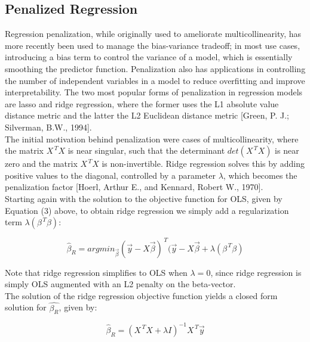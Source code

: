 \documentclass[12pt]{article}
\begin{document}
\subsection{Penalized Regression}\label{subsec3}

Regression penalization, while originally used to ameliorate multicollinearity, has more recently been used to manage the bias-variance tradeoff; in most use cases, introducing a bias term to control the variance of a model, which is essentially smoothing the predictor function. Penalization also has applications in controlling the number of independent variables in a model to reduce overfitting and improve interpretability. The two most popular forms of penalization in regression models are lasso and ridge regression, where the former uses the L1 absolute value distance metric and the latter the L2 Euclidean distance metric [Green, P. J.; Silverman, B.W., 1994]. \\

The initial motivation behind penalization were cases of multicollinearity, where the matrix $X^{\, T}X$ is near singular, such that the determinant $det(X^{\, T}X)$ is near zero and the matrix $X^{\, T}X$ is non-invertible. Ridge regression solves this by adding positive values to the diagonal, controlled by a parameter $\lambda$, which becomes the penalization factor [Hoerl, Arthur E., and Kennard, Robert W., 1970]. \\

Starting again with the solution to the objective function for OLS, given by Equation (3) above, to obtain ridge regression we simply add a regularization term $\lambda(\beta^{\, T}\beta)$:

\begin{equation}
\hat{\beta}_{R}=argmin_{\vec{\beta}}(\vec{y}-X\vec{\beta})^{\, T}(\vec{y}-X\vec{\beta}+\lambda(\beta^{\, T}\beta)\label{eq6}
\end{equation}

Note that ridge regression simplifies to OLS when $\lambda=0$, since ridge regression is simply OLS augmented with an L2 penalty on the beta-vector.\\

The solution of the ridge regression objective function yields a closed form solution for $\hat{\beta_R}$, given by:

\begin{equation}
\hat{\beta}_{R}=(X^{\, T}X+\lambda I)^{-1}X^{\, T}\vec{y}\label{eq7}
\end{equation}
\end{document}
